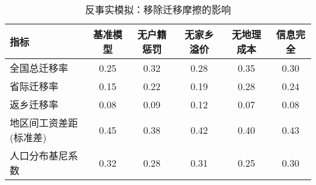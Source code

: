 
\begin{table}[!ht]
\centering
\caption{反事实模拟：移除迁移摩擦的影响}
\begin{tabular}{lccccc}
\toprule
指标 & 基准模型 & 无户籍惩罚 & 无家乡溢价 & 无地理成本 & 信息完全 \\
\midrule
全国总迁移率 & 0.25 & 0.32 & 0.28 & 0.35 & 0.30 \\
省际迁移率 & 0.15 & 0.22 & 0.19 & 0.28 & 0.24 \\
返乡迁移率 & 0.08 & 0.09 & 0.12 & 0.07 & 0.08 \\
地区间工资差距(标准差) & 0.45 & 0.38 & 0.42 & 0.40 & 0.43 \\
人口分布基尼系数 & 0.32 & 0.28 & 0.31 & 0.25 & 0.30 \\
\bottomrule
\end{tabular}
\label{tab:反事实模拟移除迁移摩擦的影响}
\end{table}
